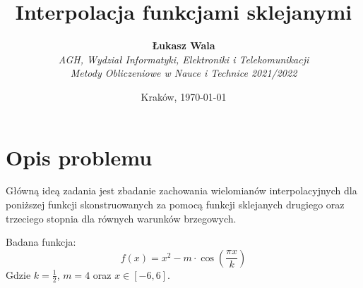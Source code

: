 \documentclass{article}
\title{Interpolacja funkcjami sklejanymi}
\author{\textbf{Łukasz Wala}\\
    \textit{AGH, Wydział Informatyki, Elektroniki i Telekomunikacji} \\
    \textit{Metody Obliczeniowe w Nauce i Technice 2021/2022}}
\date{Kraków, \today}
\begin{document}
\maketitle

\section{Opis problemu}
Główną ideą zadania jest zbadanie zachowania wielomianów interpolacyjnych
dla poniższej funkcji skonstruowanych za pomocą funkcji sklejanych drugiego oraz
trzeciego stopnia dla równych warunków brzegowych.

Badana funkcja:
\[f(x)=x^2-m\cdot\cos\left(\frac{\pi x}{k}\right)\]
Gdzie $k=\frac{1}{2}$, $m=4$ oraz $x\in [-6,6]$.
\end{document}
